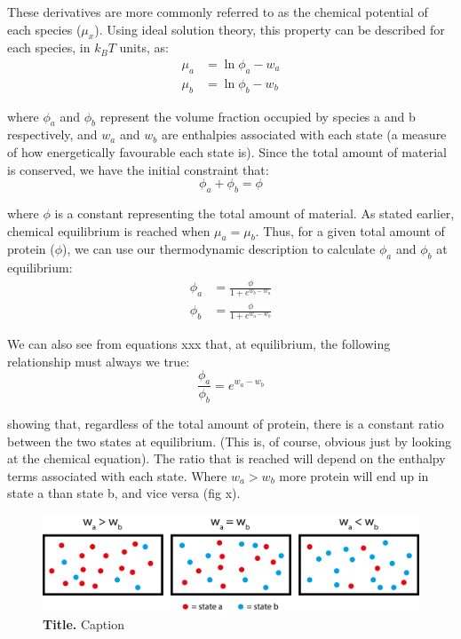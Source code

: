 \documentclass[12pt]{"article"}
\newcommand{\mycaption}[2]{\caption[#1]{\textbf{#1.} #2}}
\begin{document}
These derivatives are more commonly referred to as the chemical potential of each species ($\mu_x$). Using ideal solution theory, this property can be described for each species, in $k_BT$ units, as:
\begin{align}
\mu_a &= \ln\phi_a - w_a\\
\mu_b &= \ln\phi_b - w_b
\end{align} 

where $\phi_a$ and $\phi_b$ represent the volume fraction occupied by species a and b respectively, and $w_a$ and $w_b$ are enthalpies associated with each state (a measure of how energetically favourable each state is). Since the total amount of material is conserved, we have the initial constraint that:
\begin{equation}
\phi_a + \phi_b = \phi
\end{equation}

where $\phi$ is a constant representing the total amount of material. As stated earlier, chemical equilibrium is reached when $\mu_a = \mu_b$. Thus, for a given total amount of protein ($\phi$), we can use our thermodynamic description to calculate $\phi_a$ and $\phi_b$ at equilibrium:
\begin{align}
\phi_a &= \frac{\phi}{1 + e^{w_b - w_a}}\\
\phi_b &= \frac{\phi}{1 + e^{w_a - w_b}}
\end{align}

We can also see from equations xxx that, at equilibrium, the following relationship must always we true:
\begin{equation}
\frac{\phi_a}{\phi_b} = e^{w_a - w_b}
\end{equation}

showing that, regardless of the total amount of protein, there is a constant ratio between the two states at equilibrium. (This is, of course, obvious just by looking at the chemical equation). The ratio that is reached will depend on the enthalpy terms associated with each state. Where $w_a > w_b$ more protein will end up in state a than state b, and vice versa (fig x).\\

\begin{figure}[!h]
\includegraphics[scale=0.9]{thermodynamic_simple_example2}
\setlength{\abovecaptionskip}{20pt}
\centering
\mycaption{Title}{Caption}
\label{fig:thermodynamic_simple_example2}
\end{figure}
\end{document}
